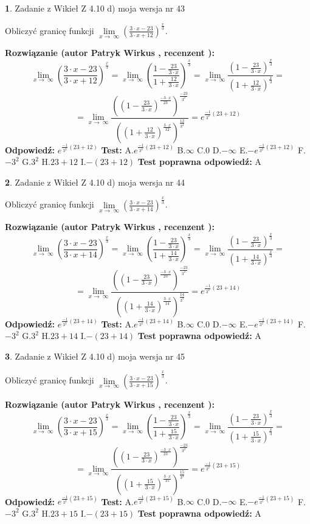 \documentclass[12pt, a4paper]{article}
\theoremstyle{definition} %
\newtheorem{zad}{}
\newcommand{\zadStart}[1]{\begin{zad}#1\newline}
\newcommand{\zadStop}{\end{zad}}
\newcommand{\rozwStart}[2]{\noindent \textbf{Rozwiązanie (autor #1 , recenzent #2): }\newline}
\newcommand{\rozwStop}{\newline}
\newcommand{\odpStart}{\noindent \textbf{Odpowiedź:}\newline}
\newcommand{\odpStop}{\newline}
\newcommand{\testStart}{\noindent \textbf{Test:}\newline}
\newcommand{\testStop}{\newline}
\newcommand{\kluczStart}{\noindent \textbf{Test poprawna odpowiedź:}\newline}
\newcommand{\kluczStop}{\newline}
\begin{document}
\zadStart{Zadanie z Wikieł Z 4.10 d) moja wersja nr 43}


Obliczyć granicę funkcji  $\lim\limits_{x\to\ \infty}(\frac{3\cdot x-23}{3\cdot x+12})^{\frac{x}{3}}$.
\zadStop
\rozwStart{Patryk Wirkus}{}
$$\lim\limits_{x\to\ \infty}(\frac{3\cdot x-23}{3\cdot x+12})^{\frac{x}{3}} = \lim\limits_{x\to\ \infty}(\frac{1-\frac{23}{3\cdot x}}{1+\frac{12}{3\cdot x}})^{\frac{x}{3}}=\lim\limits_{x\to\ \infty}\frac{(1-\frac{23}{3\cdot x})^{\frac{x}{3}}}{(1+\frac{12}{3\cdot x})^{\frac{x}{3}}}=$$
$$=\lim\limits_{x\to\ \infty}\frac{((1-\frac{23}{3\cdot x})^{\frac{-3\cdot x}{23}})^{\frac{-23}{3^{2}}}}{((1+\frac{12}{3\cdot x})^{\frac{3\cdot x}{12}})^{\frac{12}{3^{2}}}}=e^{\frac{-1}{3^{2}}(23+12)}$$
\rozwStop
\odpStart
$e^{\frac{-1}{3^{2}}(23+12)}$
\odpStop
\testStart
A.$e^{\frac{-1}{3^{2}}(23+12)}$ B.$\infty$ C.$0$ D.$-\infty$ E.$-e^{\frac{-1}{3^{2}}(23+12)}$
F.$-3^{2}$ G.$3^{2}$
H.$23+12$
I.$-(23+12)$
\testStop
\kluczStart
A
\kluczStop



\zadStart{Zadanie z Wikieł Z 4.10 d) moja wersja nr 44}


Obliczyć granicę funkcji  $\lim\limits_{x\to\ \infty}(\frac{3\cdot x-23}{3\cdot x+14})^{\frac{x}{3}}$.
\zadStop
\rozwStart{Patryk Wirkus}{}
$$\lim\limits_{x\to\ \infty}(\frac{3\cdot x-23}{3\cdot x+14})^{\frac{x}{3}} = \lim\limits_{x\to\ \infty}(\frac{1-\frac{23}{3\cdot x}}{1+\frac{14}{3\cdot x}})^{\frac{x}{3}}=\lim\limits_{x\to\ \infty}\frac{(1-\frac{23}{3\cdot x})^{\frac{x}{3}}}{(1+\frac{14}{3\cdot x})^{\frac{x}{3}}}=$$
$$=\lim\limits_{x\to\ \infty}\frac{((1-\frac{23}{3\cdot x})^{\frac{-3\cdot x}{23}})^{\frac{-23}{3^{2}}}}{((1+\frac{14}{3\cdot x})^{\frac{3\cdot x}{14}})^{\frac{14}{3^{2}}}}=e^{\frac{-1}{3^{2}}(23+14)}$$
\rozwStop
\odpStart
$e^{\frac{-1}{3^{2}}(23+14)}$
\odpStop
\testStart
A.$e^{\frac{-1}{3^{2}}(23+14)}$ B.$\infty$ C.$0$ D.$-\infty$ E.$-e^{\frac{-1}{3^{2}}(23+14)}$
F.$-3^{2}$ G.$3^{2}$
H.$23+14$
I.$-(23+14)$
\testStop
\kluczStart
A
\kluczStop



\zadStart{Zadanie z Wikieł Z 4.10 d) moja wersja nr 45}


Obliczyć granicę funkcji  $\lim\limits_{x\to\ \infty}(\frac{3\cdot x-23}{3\cdot x+15})^{\frac{x}{3}}$.
\zadStop
\rozwStart{Patryk Wirkus}{}
$$\lim\limits_{x\to\ \infty}(\frac{3\cdot x-23}{3\cdot x+15})^{\frac{x}{3}} = \lim\limits_{x\to\ \infty}(\frac{1-\frac{23}{3\cdot x}}{1+\frac{15}{3\cdot x}})^{\frac{x}{3}}=\lim\limits_{x\to\ \infty}\frac{(1-\frac{23}{3\cdot x})^{\frac{x}{3}}}{(1+\frac{15}{3\cdot x})^{\frac{x}{3}}}=$$
$$=\lim\limits_{x\to\ \infty}\frac{((1-\frac{23}{3\cdot x})^{\frac{-3\cdot x}{23}})^{\frac{-23}{3^{2}}}}{((1+\frac{15}{3\cdot x})^{\frac{3\cdot x}{15}})^{\frac{15}{3^{2}}}}=e^{\frac{-1}{3^{2}}(23+15)}$$
\rozwStop
\odpStart
$e^{\frac{-1}{3^{2}}(23+15)}$
\odpStop
\testStart
A.$e^{\frac{-1}{3^{2}}(23+15)}$ B.$\infty$ C.$0$ D.$-\infty$ E.$-e^{\frac{-1}{3^{2}}(23+15)}$
F.$-3^{2}$ G.$3^{2}$
H.$23+15$
I.$-(23+15)$
\testStop
\kluczStart
A
\kluczStop
\end{document}
